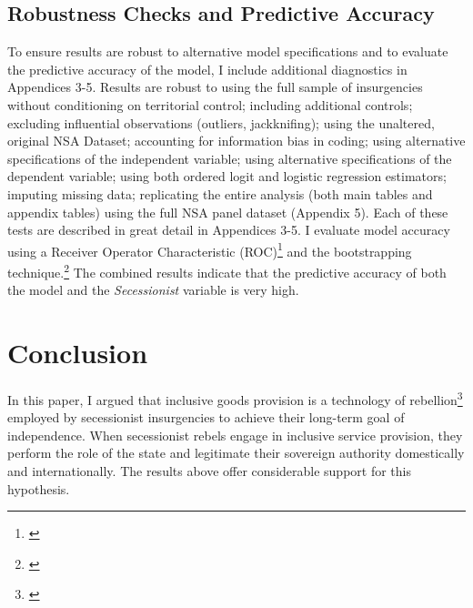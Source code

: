 \documentclass[12pt, letterpaper]{article}
\begin{document}
\subsection*{Robustness Checks and Predictive Accuracy}

To ensure results are robust to alternative model specifications and to evaluate the predictive accuracy of the model, I include additional diagnostics in Appendices 3-5. Results are robust to using the full sample of insurgencies without conditioning on territorial control; including additional controls; excluding influential observations (outliers, jackknifing); using the unaltered, original NSA Dataset; accounting for information bias in coding; using alternative specifications of the independent variable; using alternative specifications of the dependent variable; using both ordered logit and logistic regression estimators; imputing missing data; replicating the entire analysis (both main tables and appendix tables) using the full NSA panel dataset (Appendix 5). Each of these tests are described in great detail in Appendices 3-5. I evaluate model accuracy using a Receiver Operator Characteristic (ROC)\footnote{\citealt{ward2010perils,young2012repression}} and the bootstrapping technique.\footnote{\citealt{efron1983leisurely, efron1997improvements}} The combined results indicate that the predictive accuracy of both the model and the \textit{Secessionist} variable is very high. 



\section*{Conclusion}

In this paper, I argued that inclusive goods provision is a technology of rebellion\footnote{\citealt{kalyvas2010international}} employed by secessionist insurgencies to achieve their long-term goal of independence. When secessionist rebels engage in inclusive service provision, they perform the role of the state and legitimate their sovereign authority domestically and internationally. The results above offer considerable support for this hypothesis.
\end{document}
